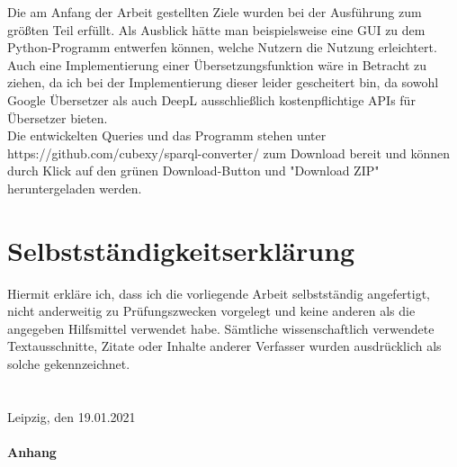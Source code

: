 \documentclass[headsepline,titlepage,ngerman,twoside,12pt]{report}
\begin{document}
Die am Anfang der Arbeit gestellten Ziele wurden bei der Ausführung zum größten Teil erfüllt. Als Ausblick hätte man beispielsweise eine GUI zu dem Python-Programm entwerfen können, welche Nutzern die Nutzung erleichtert.
Auch eine Implementierung einer Übersetzungsfunktion wäre in Betracht zu ziehen, da ich bei der Implementierung dieser leider gescheitert bin, da sowohl Google Übersetzer als auch DeepL ausschließlich kostenpflichtige APIs für Übersetzer bieten.\\

Die entwickelten Queries und das Programm stehen unter \\
https://github.com/cubexy/sparql-converter/ zum Download bereit und können durch Klick auf den grünen Download-Button und "Download ZIP" heruntergeladen werden.

\chapter{Selbstständigkeitserklärung}
Hiermit erkläre ich, dass ich die vorliegende Arbeit selbstständig angefertigt, nicht anderweitig zu Prüfungszwecken vorgelegt und keine anderen als die angegeben Hilfsmittel verwendet habe. Sämtliche wissenschaftlich verwendete Textausschnitte, Zitate oder Inhalte anderer Verfasser wurden ausdrücklich als solche gekennzeichnet.\\\\\\

Leipzig, den 19.01.2021


\newpage
\subsubsection{Anhang}
\end{document}
